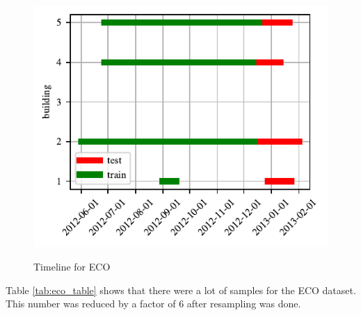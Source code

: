 \begin{figure}[H]
	\centering
	\caption{Timeline for ECO}
	\includegraphics[]{Figures/EC/eco_timeline.pdf}
	\label{fig:eco_timeline}
\end{figure}

Table \ref{tab:eco_table} shows that there were a lot of samples for the ECO dataset.
This number was reduced by a factor of 6 after resampling was done.

